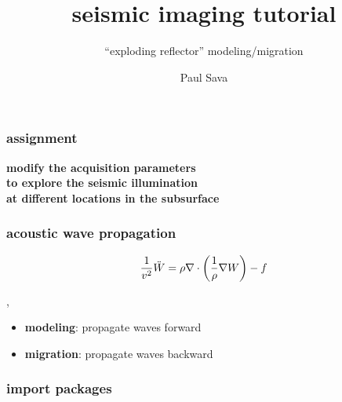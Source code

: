


\title[]{seismic imaging tutorial}
\subtitle{``exploding reflector'' modeling/migration}
\author[]{Paul Sava}
\date{}


\def\big#1{\begin{center} \LARGE \textbf{#1} \end{center}}
\def\cen#1{\begin{center}        \textbf{#1} \end{center}}

 { \cwpcover }


\begin{frame} \frametitle{assignment}

  \cen{modify the acquisition parameters \\
    to explore the seismic illumination \\
    at different locations in the subsurface}
  
\end{frame}
\cwpnote{}

\begin{frame} \frametitle{acoustic wave propagation}

\[
\frac{1}{v^2} \ddot{W} = 
\rho \nabla \cdot {\left (\frac{1}{\rho} \nabla {W} \right)} -f
\]

\sep

\begin{itemize}
   \item \textbf{modeling}: propagate waves forward
   \item \textbf{migration}: propagate waves backward 
\end{itemize}

\end{frame}
\cwpnote{}

\begin{frame} \frametitle{import packages}

\end{frame}
\cwpnote{}

